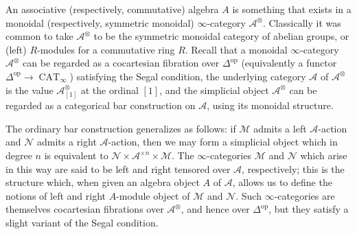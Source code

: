 \documentclass[12pt]{article}
\theoremstyle{definition}
\newcommand{\A}{\mathcal{A}}
\newcommand{\M}{\mathcal{M}}
\newcommand{\N}{\mathcal{N}}
\renewcommand{\i}{\infty}
\newcommand{\op}{\mathrm{op}}
\DeclareMathOperator{\CAT}{CAT}
\begin{document}
An associative (respectively, commutative) algebra $A$ is something that exists in a monoidal (respectively, symmetric monoidal) $\i$-category $\A^\otimes$.
Classically it was common to take $\A^\otimes$ to be the symmetric monoidal category of abelian groups, or (left) $R$-modules for a commutative ring $R$.
Recall that a monoidal $\i$-category $\A^\otimes$ can be regarded as a cocartesian fibration over $\Delta^{\op}$ (equivalently a functor $\Delta^{\op}\to\CAT_\i$)  satisfying the Segal condition, the underlying category $\A$ of $\A^\otimes$ is the value $\A^\otimes_{[1]}$ at the ordinal $[1]$, and the simplicial object $\A^\otimes$ can be regarded as a categorical bar construction on $\A$, using its monoidal structure.

The ordinary bar construction generalizes as follows:  if $\M$ admits a left $\A$-action and $\N$ admits a right $\A$-action, then we may form a simplicial object which in degree $n$ is equivalent to $\N\times\A^{\times n}\times\M$.
The $\infty$-categories $\M$ and $\N$ which arise in this way are said to be left and right tensored over $\A$, respectively; this is the structure which, when given an algebra object $A$ of $\A$, allows us to define the notions of left and right $A$-module object of $\M$ and $\N$.
Such $\i$-categories are themselves cocartesian fibrations over $\A^\otimes$, and hence over $\Delta^{\op}$, but they satisfy a slight variant of the Segal condition.
\end{document}
